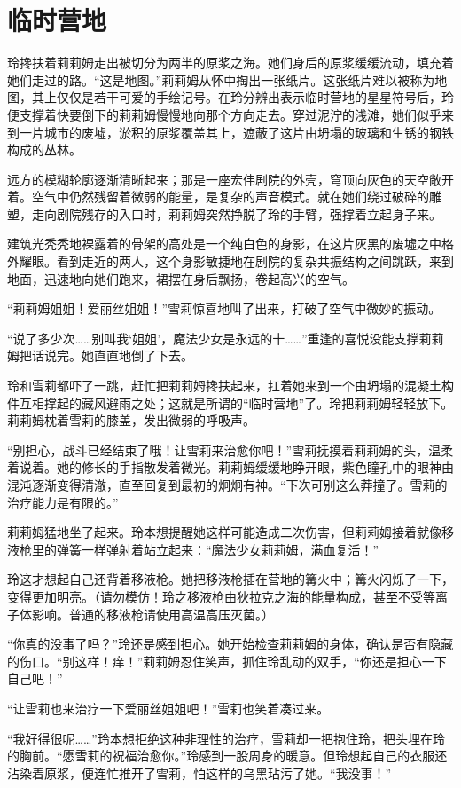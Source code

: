 \chapter{临时营地}

玲搀扶着莉莉姆走出被切分为两半的原浆之海。她们身后的原浆缓缓流动，填充着她们走过的路。“这是地图。”莉莉姆从怀中掏出一张纸片。这张纸片难以被称为地图，其上仅仅是若干可爱的手绘记号。在玲分辨出表示临时营地的星星符号后，玲便支撑着快要倒下的莉莉姆慢慢地向那个方向走去。穿过泥泞的浅滩，她们似乎来到一片城市的废墟，淤积的原浆覆盖其上，遮蔽了这片由坍塌的玻璃和生锈的钢铁构成的丛林。

远方的模糊轮廓逐渐清晰起来；那是一座宏伟剧院的外壳，穹顶向灰色的天空敞开着。空气中仍然残留着微弱的能量，是复杂的声音模式。就在她们绕过破碎的雕塑，走向剧院残存的入口时，莉莉姆突然挣脱了玲的手臂，强撑着立起身子来。

建筑光秃秃地裸露着的骨架的高处是一个纯白色的身影，在这片灰黑的废墟之中格外耀眼。看到走近的两人，这个身影敏捷地在剧院的复杂共振结构之间跳跃，来到地面，迅速地向她们跑来，裙摆在身后飘扬，卷起高兴的空气。

“莉莉姆姐姐！爱丽丝姐姐！”雪莉惊喜地叫了出来，打破了空气中微妙的振动。

“说了多少次……别叫我‘姐姐’，魔法少女是永远的十……”重逢的喜悦没能支撑莉莉姆把话说完。她直直地倒了下去。

玲和雪莉都吓了一跳，赶忙把莉莉姆搀扶起来，扛着她来到一个由坍塌的混凝土构件互相撑起的藏风避雨之处；这就是所谓的“临时营地”了。玲把莉莉姆轻轻放下。莉莉姆枕着雪莉的膝盖，发出微弱的呼吸声。

“别担心，战斗已经结束了哦！让雪莉来治愈你吧！”雪莉抚摸着莉莉姆的头，温柔着说着。她的修长的手指散发着微光。莉莉姆缓缓地睁开眼，紫色瞳孔中的眼神由混沌逐渐变得清澈，直至回复到最初的炯炯有神。“下次可别这么莽撞了。雪莉的治疗能力是有限的。”

莉莉姆猛地坐了起来。玲本想提醒她这样可能造成二次伤害，但莉莉姆接着就像移液枪里的弹簧一样弹射着站立起来：“魔法少女莉莉姆，满血复活！”

玲这才想起自己还背着移液枪。她把移液枪插在营地的篝火中；篝火闪烁了一下，变得更加明亮。（请勿模仿！玲之移液枪由狄拉克之海的能量构成，甚至不受等离子体影响。普通的移液枪请使用高温高压灭菌。）

“你真的没事了吗？”玲还是感到担心。她开始检查莉莉姆的身体，确认是否有隐藏的伤口。“别这样！痒！”莉莉姆忍住笑声，抓住玲乱动的双手，“你还是担心一下自己吧！”

“让雪莉也来治疗一下爱丽丝姐姐吧！”雪莉也笑着凑过来。

“我好得很呢……”玲本想拒绝这种非理性的治疗，雪莉却一把抱住玲，把头埋在玲的胸前。“愿雪莉的祝福治愈你。”玲感到一股周身的暖意。但玲想起自己的衣服还沾染着原浆，便连忙推开了雪莉，怕这样的乌黑玷污了她。“我没事！”

